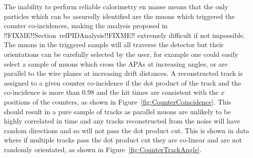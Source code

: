 The inability to perform reliable calorimetry en masse means that the only particles which can be assuredly identified are the muons which triggered the counter co-incidences, making the analysis proposed in !!FIXME!!Section~ref{PIDAnalysis}!!FIXME!! extremely difficult if not impossible. The muons in the triggered sample will all traverse the detector but their orientations can be carefully selected by the user, for example one could easily select a sample of muons which cross the APAs at increasing angles, or are parallel to the wire planes at increasing drift distances. A reconstructed track is assigned to a given counter co-incidence if the dot product of the track and the co-incidence is more than 0.98 and the hit times are consistent with the $x$ positions of the counters, as shown in Figure~\ref{fig:CounterCoincidence}. This should result in a pure sample of tracks as parallel muons are unlikely to be highly correlated in time and any tracks reconstructed from the noise will have random directions and so will not pass the dot product cut. This is shown in data where if multiple tracks pass the dot product cut they are co-linear and are not randomly orientated, as shown in Figure~\ref{fig:CounterTrackAngle}. \\

